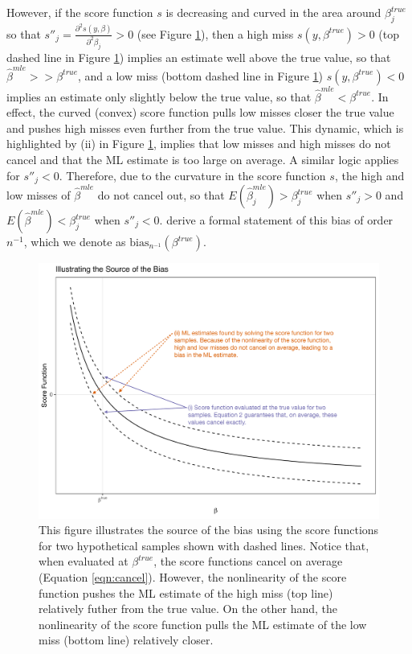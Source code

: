 \documentclass[12pt]{article}
\begin{document}
However, if the score function $s$ is decreasing and curved in the area around $\beta^{true}_j$ so that $s''_j = \frac{\partial^2 s(y, \beta)}{\partial^2 \beta_j} > 0$ (see Figure \ref{fig:illustrate}), then a high miss $s(y, \beta^{true}) > 0$ (top dashed line in Figure \ref{fig:illustrate}) implies an estimate well above the true value, so that $\hat{\beta}^{mle} >> \beta^{true}$, and a low miss (bottom dashed line in Figure \ref{fig:illustrate}) $s(y, \beta^{true}) < 0$ implies an estimate only slightly below the true value, so that $\hat{\beta}^{mle} < \beta^{true}$.
In effect, the curved (convex) score function pulls low misses closer the true value and pushes high misses even further from the true value.
This dynamic, which is highlighted by (ii) in Figure \ref{fig:illustrate}, implies that low misses and high misses do not cancel and that the ML estimate is too large on average.
A similar logic applies for $s''_j < 0$. 
Therefore, due to the curvature in the score function $s$, the high and low misses of $\hat{\beta}^{mle}$ do not cancel out, so that $E(\hat{\beta}^{mle}_j) > \beta^{true}_j$ when $s''_j > 0$ and $E(\hat{\beta}^{mle}) < \beta^{true}_j$ when $s''_j < 0$.
\citet[pp. 251-252]{CoxSnell1968} derive a formal statement of this bias of order $n^{-1}$, which we denote as $\text{bias}_{n^{-1}}(\beta^{true})$. 

\begin{figure}[h]
\begin{center}
\includegraphics[scale = .4]{figs/illustrate-bias-annotated.pdf}
\caption{This figure illustrates the source of the bias using the score functions for two hypothetical samples shown with dashed lines. Notice that, when evaluated at $\beta^{true}$, the score functions cancel on average (Equation \ref{eqn:cancel}). However, the nonlinearity of the score function pushes the ML estimate of the high miss (top line) relatively futher from the true value. On the other hand, the nonlinearity of the score function pulls the ML estimate of the low miss (bottom line) relatively closer.}\label{fig:illustrate}
\end{center}
\end{figure}
\end{document}
